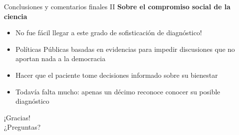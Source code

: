 \documentclass[aspectratio=169]{beamer}
\newcommand{\pro}{\item [$\blacktriangleright$]}
\begin{document}
\begin{frame}{Conclusiones y comentarios finales II}
\textcolor{preambulo}{\textbf{Sobre el compromiso social de la ciencia}}
    \begin{itemize}
    \pro No fue fácil llegar a este grado de sofisticación de diagnóstico!
    \pro Políticas Públicas basadas en evidencias para impedir discusiones que no aportan nada a la democracia
    \pro Hacer que el paciente tome decisiones informado sobre su bienestar
    \pro Todavía falta mucho: apenas un décimo reconoce conocer su posible diagnóstico
\end{itemize}
\end{frame}

\begin{frame}{}
    \vfill
    \centering
    \Huge
    ¡Gracias!\\
    \textcolor{preambulo}{¿Preguntas?}
    \vfill
\end{frame}
\end{document}
